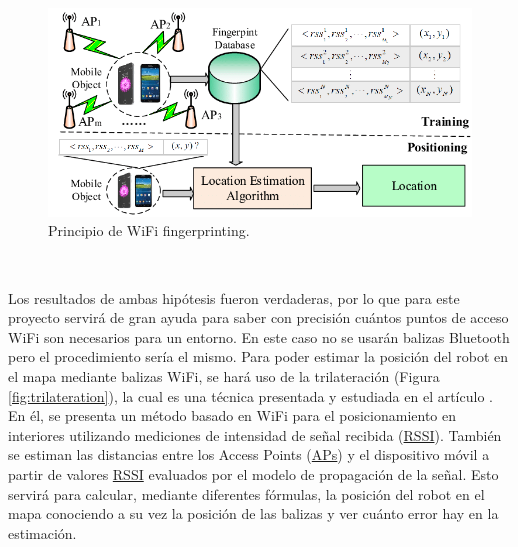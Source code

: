 \begin{figure} [H]
  \begin{center}
    \includegraphics[scale=0.6]{figs/wifi}
  \end{center}
  \caption{Principio de WiFi fingerprinting.}
  \label{fig:wifi}
\end{figure}\

Los resultados de ambas hipótesis fueron verdaderas, por lo que para este proyecto servirá de gran ayuda para saber con precisión cuántos puntos de acceso WiFi son necesarios para un entorno. En este caso no se usarán balizas Bluetooth pero el procedimiento sería el mismo. Para poder estimar la posición del robot en el mapa mediante balizas WiFi, se hará uso de la trilateración (Figura \ref{fig:trilateration}), la cual es una técnica presentada y estudiada en el artículo \cite{inproceedings}. En él, se presenta un método basado en WiFi para el posicionamiento en interiores utilizando mediciones de intensidad de señal recibida (\hyperlink{RSSI}{RSSI}). También se estiman las distancias entre los Access Points (\hyperlink{APs}{APs}) y el dispositivo móvil a partir de valores \hyperlink{RSSI}{RSSI} evaluados por el modelo de propagación de la señal. Esto servirá para calcular, mediante diferentes fórmulas, la posición del robot en el mapa conociendo a su vez la posición de las balizas y ver cuánto error hay en la estimación.\\


